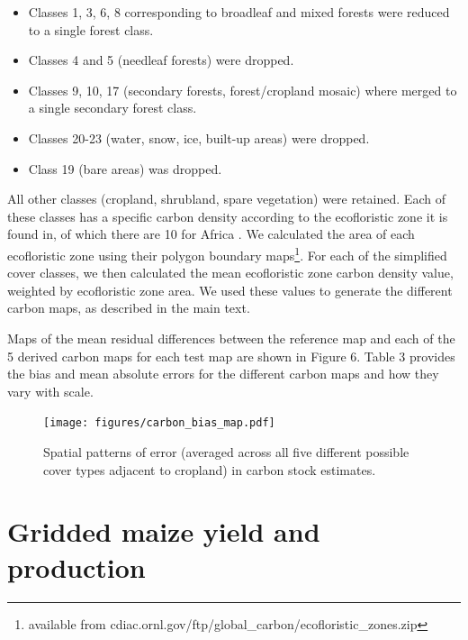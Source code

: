 \documentclass[11pt, titlepage]{article}
\begin{document}
\begin{itemize}
\item Classes 1, 3, 6, 8 corresponding to broadleaf and mixed forests were reduced to a single forest class.
\item Classes 4 and 5 (needleaf forests) were dropped. 
\item Classes 9, 10, 17 (secondary forests, forest/cropland mosaic) where merged to a single secondary forest class.
\item Classes 20-23 (water, snow, ice, built-up areas) were dropped.
\item Class 19 (bare areas) was dropped.
\end{itemize}

All other classes (cropland, shrubland, spare vegetation) were retained. Each of these classes has a specific carbon density according to the ecofloristic zone it is found in, of which there are 10 for Africa \citep[Zones 6-9 and 10-15; see][]{ruesch_new_2008}. We calculated the area of each ecofloristic zone using their polygon boundary maps\footnote{available from cdiac.ornl.gov/ftp/global\_carbon/ecofloristic\_zones.zip}. For each of the simplified cover classes, we then calculated the mean ecofloristic zone carbon density value, weighted by ecofloristic zone area. We used these values to generate the different carbon maps, as described in the main text.  

Maps of the mean residual differences between the reference map and each of the 5 derived carbon maps for each test map are shown in Figure 6. Table 3 provides the bias and mean absolute errors for the different carbon maps and how they vary with scale.  

\begin{figure}[!ht]
  \centering
     \texttt{[image: figures/carbon\_bias\_map.pdf]} 
      \caption{Spatial patterns of error (averaged across all five different possible cover types adjacent to cropland) in carbon stock estimates. }
      \label{fig:default}
\end{figure}

%

\FloatBarrier


\clearpage
\section{\large Gridded maize yield and production}
\end{document}
